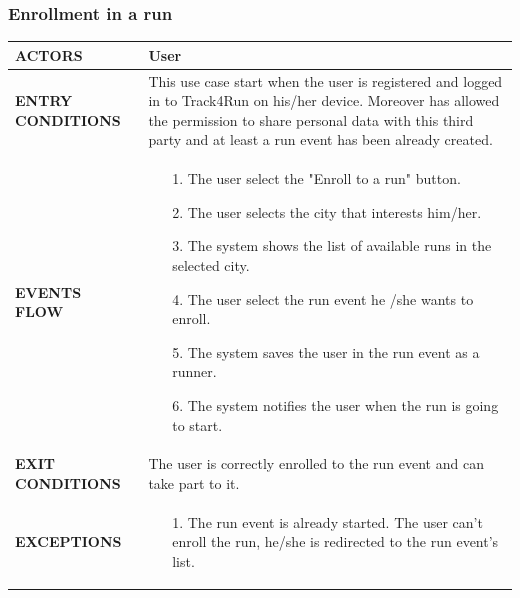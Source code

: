 \documentclass[a4paper]{article}
\begin{document}
\subsubsection{Enrollment in a run}
\begin{center}
    \begin{tabular}{l || p{8cm} ||}
        \bf{ACTORS} & User \\ \hline
        \bf{ENTRY CONDITIONS} & This use case start when the user is registered and logged in to Track4Run on his/her device. Moreover has allowed the permission to share personal data with this third party and at least a run event has been already created. \\ \hline
        \bf{EVENTS FLOW} & \begin{itemize}[noitemsep, topsep=0cm, leftmargin=*] \vspace{-0.2cm}
            \item[1.] The user select the "Enroll to a run" button.
            \item[2.] The user selects the city that interests him/her.
            \item[3.] The system shows the list of available runs in the selected city.
            \item[4.] The user select the run event he /she wants to enroll.
            \item[5.] The system saves the user in the run event as a runner.
            \item[6.] The system notifies the user when the run is going to start.
        \end{itemize}
        \\ \hline
        \bf{EXIT CONDITIONS} & The user is correctly enrolled to the run event and can take part to it. \\ \hline
        \bf{EXCEPTIONS} & \begin{itemize}[noitemsep, topsep=0cm, leftmargin=*] \vspace{-0.2cm}
            \item[1.] The run event is already started. The user can't enroll the run, he/she is redirected to the run event's list.
        \end{itemize}
        \\ \hline \hline
    \end{tabular}
\end{center}

\vspace{1cm}
\end{document}
